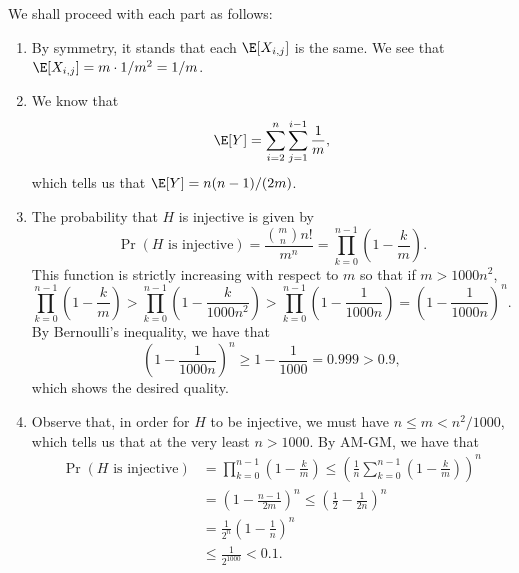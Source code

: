 \begin{solution}
    We shall proceed with each part as follows:
    \begin{enumerate}
        \item By symmetry, it stands that each \( \E [X_{i,j}] \) is the same. We see that \( \E [X_{i,j}] = m \cdot 1/m^2 = 1/m \).
        \item We know that
            \[
                \E [Y] = \sum_{i = 2}^{n} \sum_{j = 1}^{i - 1} \frac{1}{m}
            ,\]
            which tells us that \( \E [Y] = n(n-1)/(2m) \).
        \item The probability that \( H \) is injective is given by
            \[
                \Pr (H \text{ is injective}) = \frac{\binom{m}{n} n!}{m^n} = \prod_{k = 0}^{n - 1} \left( 1 - \frac{k}{m} \right)
            .\]
            This function is strictly increasing with respect to \( m \) so that if \( m > 1000n^2 \),
            \[
                \prod_{k = 0}^{n - 1} \left( 1 - \frac{k}{m} \right) > \prod_{k = 0}^{n - 1} \left( 1 - \frac{k}{1000n^2} \right) > \prod_{k = 0}^{n - 1} \left( 1 - \frac{1}{1000n} \right) = \left( 1 - \frac{1}{1000n} \right)^{n}
            .\]
            By Bernoulli's inequality, we have that
            \[
                \left( 1 - \frac{1}{1000n} \right)^{n} \ge 1 - \frac{1}{1000} = 0.999 > 0.9
            ,\]
            which shows the desired quality.
        \item Observe that, in order for \( H \) to be injective, we must have \( n \le m < n^2/1000 \), which tells us that at the very least \( n > 1000 \). By AM-GM, we have that
            \begin{align*}
                \Pr (H \text{ is injective}) &= \prod_{k = 0}^{n - 1} \left( 1 - \frac{k}{m} \right) \le \left( \frac{1}{n} \sum_{k = 0}^{n - 1} \left( 1 - \frac{k}{m} \right) \right)^n \\
                &= \left( 1 - \frac{n - 1}{2m} \right)^n \le \left( \frac{1}{2} - \frac{1}{2n} \right)^n \\
                &= \frac{1}{2^{n}} \left( 1 - \frac{1}{n} \right)^{n} \\
                &\le \frac{1}{2^{1000}} < 0.1
            .\end{align*}
    \end{enumerate}
\end{solution}

\setcounter{exercisenum}{11}

